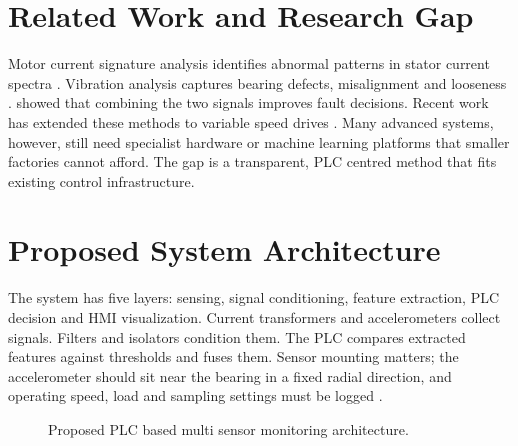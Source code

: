 \documentclass[10pt,a4paper,twocolumn]{article}
\begin{document}
\section*{Related Work and Research Gap}
Motor current signature analysis identifies abnormal patterns in stator current spectra \citep{benbouzid2000}. Vibration analysis captures bearing defects, misalignment and looseness \citep{gangsar2020}. \citet{yang2006} showed that combining the two signals improves fault decisions. Recent work has extended these methods to variable speed drives \citep{niu2023,yakhni2023}. Many advanced systems, however, still need specialist hardware or machine learning platforms that smaller factories cannot afford. The gap is a transparent, PLC centred method that fits existing control infrastructure.

\section*{Proposed System Architecture}
The system has five layers: sensing, signal conditioning, feature extraction, PLC decision and HMI visualization. Current transformers and accelerometers collect signals. Filters and isolators condition them. The PLC compares extracted features against thresholds and fuses them. Sensor mounting matters; the accelerometer should sit near the bearing in a fixed radial direction, and operating speed, load and sampling settings must be logged \citep{iso2016}.

\begin{figure}[htbp]
\centering
\small
{}
\caption{Proposed PLC based multi sensor monitoring architecture.}
\label{fig:architecture}
\end{figure}
\end{document}
